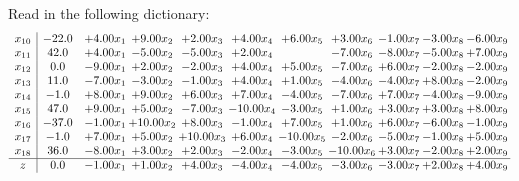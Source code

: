 \documentclass[9pt]{article}
\begin{document}
Read in the following dictionary:
\[\begin{array}{c| c c@{\hskip 2pt} c@{\hskip 2pt} c@{\hskip 2pt} c@{\hskip 2pt} c@{\hskip 2pt} c@{\hskip 2pt} c@{\hskip 2pt} c@{\hskip 2pt} c@{\hskip 2pt} }
 x_{10}   &  -22.0 & +  4.00 x_{1} & +  9.00 x_{2} & +  2.00 x_{3} & +  4.00 x_{4} & +  6.00 x_{5} & +  3.00 x_{6} & -1.00 x_{7} & -3.00 x_{8} & -6.00 x_{9}\\
 x_{11}   &  42.0 & +  4.00 x_{1} & -5.00 x_{2} & -5.00 x_{3} & +  2.00 x_{4} &   & -7.00 x_{6} & -8.00 x_{7} & -5.00 x_{8} & +  7.00 x_{9}\\
 x_{12}   &  0.0 & -9.00 x_{1} & +  2.00 x_{2} & -2.00 x_{3} & +  4.00 x_{4} & +  5.00 x_{5} & -7.00 x_{6} & +  6.00 x_{7} & -2.00 x_{8} & -2.00 x_{9}\\
 x_{13}   &  11.0 & -7.00 x_{1} & -3.00 x_{2} & -1.00 x_{3} & +  4.00 x_{4} & +  1.00 x_{5} & -4.00 x_{6} & -4.00 x_{7} & +  8.00 x_{8} & -2.00 x_{9}\\
 x_{14}   &  -1.0 & +  8.00 x_{1} & +  9.00 x_{2} & +  6.00 x_{3} & +  7.00 x_{4} & -4.00 x_{5} & -7.00 x_{6} & +  7.00 x_{7} & -4.00 x_{8} & -9.00 x_{9}\\
 x_{15}   &  47.0 & +  9.00 x_{1} & +  5.00 x_{2} & -7.00 x_{3} & -10.00 x_{4} & -3.00 x_{5} & +  1.00 x_{6} & +  3.00 x_{7} & +  3.00 x_{8} & +  8.00 x_{9}\\
 x_{16}   &  -37.0 & -1.00 x_{1} & + 10.00 x_{2} & +  8.00 x_{3} & -1.00 x_{4} & +  7.00 x_{5} & +  1.00 x_{6} & +  6.00 x_{7} & -6.00 x_{8} & -1.00 x_{9}\\
 x_{17}   &  -1.0 & +  7.00 x_{1} & +  5.00 x_{2} & + 10.00 x_{3} & +  6.00 x_{4} & -10.00 x_{5} & -2.00 x_{6} & -5.00 x_{7} & -1.00 x_{8} & +  5.00 x_{9}\\
 x_{18}   &  36.0 & -8.00 x_{1} & +  3.00 x_{2} & +  2.00 x_{3} & -2.00 x_{4} & -3.00 x_{5} & -10.00 x_{6} & +  3.00 x_{7} & -2.00 x_{8} & +  2.00 x_{9}\\
\hline
z    &  0.0 & -1.00 x_{1} & +  1.00 x_{2} & +  4.00 x_{3} & -4.00 x_{4} & -4.00 x_{5} & -3.00 x_{6} & -3.00 x_{7} & +  2.00 x_{8} & +  4.00 x_{9}\\
\end{array}\]
\end{document}
